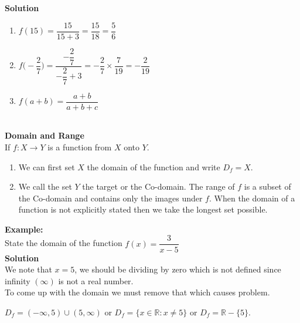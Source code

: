 \documentclass[11pt,a4paper]{article}
\begin{document}
\textbf{Solution}
\begin{enumerate}
\item $f(15)=\dfrac{15}{15+3}=\dfrac{15}{18}=\dfrac{5}{6}$\\
\item $f\bigg(-\dfrac{2}{7}\bigg)=\dfrac{-\dfrac{2}{7}}{-\dfrac{2}{7}+3}=-\dfrac{2}{7}\times \dfrac{7}{19}=-\dfrac{2}{19}$\\
\item $f(a+b)=\dfrac{a+b}{a+b+c}$\\\\
\end{enumerate}







\pagebreak
\textbf{Domain and Range}\\
If $f:X\longrightarrow Y$ is a  function from $X$ onto $Y$.
\begin{enumerate}
\item We can first set $X$ the domain of the function and write $D_f=X$.
\item We call the set $Y$ the target or the Co-domain. The range of $f$ is a subset of the Co-domain and contains only the images under $f$. When the domain of a function is not explicitly stated then we take the longest set possible.\\
\end{enumerate}


\textbf{Example:}\\
State the domain of the function $f(x)=\dfrac{3}{x-5}$\\

\textbf{Solution}\\
We note that $x=5$, we should be dividing by zero which is not defined since infinity $(\infty)$ is not a real number.\\ To come up with the domain we must remove that which causes problem.\\


\begin{figure}[H]
\centering
{}
\end{figure}

$D_f=(-\infty,5)\cup (5,\infty)$ or $D_f=\{x\in \mathbb{R}:x\neq 5\}$ or $D_f=\mathbb{R}-\{5\}$.\\\\
\end{document}
